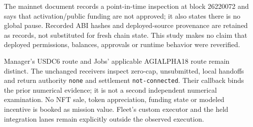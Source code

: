The mainnet document records a point-in-time inspection at block 26220072 and says that activation/public funding are not approved; it also states there is no global pause. \citep{mainnet2026} Recorded ABI hashes and deployed-source provenance are retained as records, not substituted for fresh chain state. This study makes no claim that deployed permissions, balances, approvals or runtime behavior were reverified.

Manager's USDC6 route and Jobs' applicable AGIALPHA18 route remain distinct. The unchanged receivers inspect zero-cap, unsubmitted, local handoffs and return authority \texttt{none} and settlement \texttt{not-connected}. Their callback binds the prior numerical evidence; it is not a second independent numerical examination. No NFT sale, token appreciation, funding state or modeled incentive is booked as mission value. Fleet's custom executor and the held integration lanes remain explicitly outside the observed execution.
